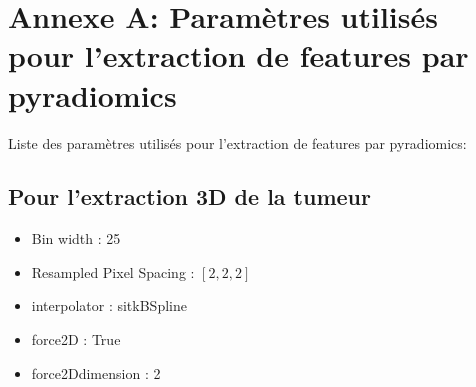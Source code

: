 \documentclass[10pt]{article}
\begin{document}
\newpage

\appendix

\section{Annexe A: Paramètres utilisés pour l'extraction de features par pyradiomics}
\label{annexeA}

Liste des paramètres utilisés pour l'extraction de features par pyradiomics:

\subsection{Pour l'extraction 3D de la tumeur}
 
\begin{itemize}[label = $\bullet$]
    \item Bin width : 25
    \item Resampled Pixel Spacing : $[2,2,2]$
    \item interpolator : sitkBSpline
    \item force2D : True
    \item force2Ddimension : 2
\end{itemize}
\end{document}

